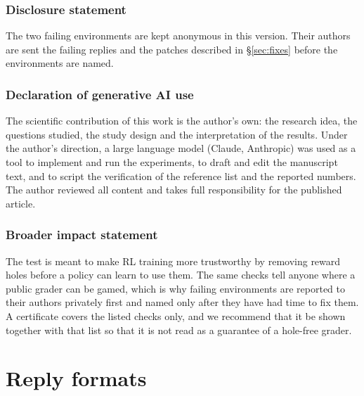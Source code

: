 \subsubsection*{Disclosure statement}
The two failing environments are kept anonymous in this version. Their authors are sent the failing replies and the patches described in \S\ref{sec:fixes} before the environments are named.

\subsubsection*{Declaration of generative AI use}
The scientific contribution of this work is the author's own: the research idea, the questions studied, the study design and the interpretation of the results. Under the author's direction, a large language model (Claude, Anthropic) was used as a tool to implement and run the experiments, to draft and edit the manuscript text, and to script the verification of the reference list and the reported numbers. The author reviewed all content and takes full responsibility for the published article.

\subsubsection*{Broader impact statement}
The test is meant to make RL training more trustworthy by removing reward holes before a policy can learn to use them. The same checks tell anyone where a public grader can be gamed, which is why failing environments are reported to their authors privately first and named only after they have had time to fix them. A certificate covers the listed checks only, and we recommend that it be shown together with that list so that it is not read as a guarantee of a hole-free grader.




\appendix

\section{Reply formats}
\label{app:templates}

